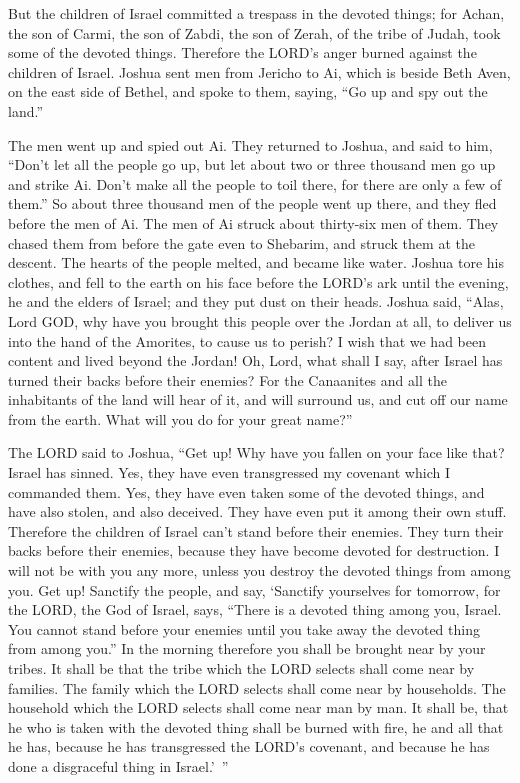 \mychapter{} \myverse*{}But the children of Israel committed a trespass in the devoted
things; for Achan, the son of Carmi, the son of Zabdi, the son of Zerah, of the tribe of Judah, took some
of the devoted things. Therefore the LORD’s anger burned against the children of Israel.
\myverse{}Joshua sent men from Jericho to Ai, which is beside Beth Aven, on the east side
of Bethel, and spoke to them, saying, “Go up and spy out the land.”

The men went up and spied out Ai.
\myverse{}They returned to Joshua, and said to him, “Don’t let all the people go up, but
let about two or three thousand men go up and strike Ai. Don’t make all the people to toil there, for
there are only a few of them.”
\myverse{}So about three thousand men of the people went up there, and they fled before
the men of Ai.
\myverse{}The men of Ai struck about thirty-six men of them. They chased them from before
the gate even to Shebarim, and struck them at the descent. The hearts of the people melted, and became
like water.
\myverse{}Joshua tore his clothes, and fell to the earth on his face before the LORD’s
ark until the evening, he and the elders of Israel; and they put dust on their heads.
\myverse{}Joshua said, “Alas, Lord GOD, why have you brought this people over the Jordan
at all, to deliver us into the hand of the Amorites, to cause us to perish? I wish that we had been content
and lived beyond the Jordan!
\myverse{}Oh, Lord, what shall I say, after Israel has turned their backs before their
enemies?
\myverse{}For the Canaanites and all the inhabitants of the land will hear of it, and
will surround us, and cut off our name from the earth. What will you do for your great name?”

\myverse{}The LORD said to Joshua, “Get up! Why have you fallen on your
face like that?
\myverse{}Israel has sinned. Yes, they have even transgressed my covenant which I commanded
them. Yes, they have even taken some of the devoted things, and have also stolen, and also deceived. They
have even put it among their own stuff.
\myverse{}Therefore the children of Israel can’t stand before their enemies. They turn
their backs before their enemies, because they have become devoted for destruction. I will not be with
you any more, unless you destroy the devoted things from among you.
\myverse{}Get up! Sanctify the people, and say, ‘Sanctify yourselves for tomorrow, for
the LORD, the God of Israel, says, “There is a devoted thing among you, Israel. You cannot stand before
your enemies until you take away the devoted thing from among you.”
\myverse{}In the morning therefore you shall be brought near by your tribes. It shall
be that the tribe which the LORD selects shall come near by families. The family which the LORD selects
shall come near by households. The household which the LORD selects shall come near man by man.
\myverse{}It shall be, that he who is taken with the devoted thing shall be burned with
fire, he and all that he has, because he has transgressed the LORD’s covenant, and because he has done
a disgraceful thing in Israel.’ ”

